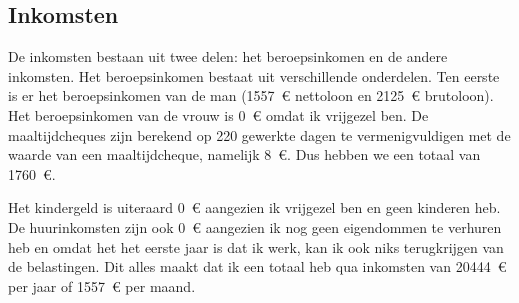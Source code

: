 
\subsection{Inkomsten}

De inkomsten bestaan uit twee delen: het beroepsinkomen en de andere inkomsten.
Het beroepsinkomen bestaat uit verschillende onderdelen. Ten eerste is er het beroepsinkomen van de man (1557~\euro{} nettoloon en 2125~\euro{} brutoloon). Het beroepsinkomen van de vrouw is 0~\euro{} omdat ik vrijgezel ben. De maaltijdcheques zijn berekend op 220 gewerkte dagen te vermenigvuldigen met de waarde van een maaltijdcheque, namelijk 8~\euro{}. Dus hebben we een totaal van 1760~\euro{}.

Het kindergeld is uiteraard 0~\euro{} aangezien ik vrijgezel ben en geen kinderen heb. De huurinkomsten zijn ook 0~\euro{} aangezien ik nog geen eigendommen te verhuren heb en omdat het het eerste jaar is dat ik werk, kan ik ook niks terugkrijgen van de belastingen.
Dit alles maakt dat ik een totaal heb qua inkomsten van 20444~\euro{} per jaar of 1557~\euro{} per maand.

%


